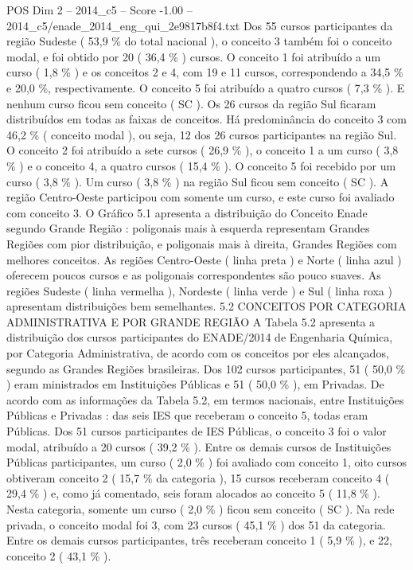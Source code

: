 \begin{textsample}{POS Dim 2 – 2014\_c5 – Score -1.00 – 2014\_c5/enade\_2014\_eng\_qui\_2e9817b8f4.txt}
Dos 55 cursos participantes da região Sudeste ( 53,9 \% do total nacional ), o conceito 3 também foi o conceito modal, e foi obtido por 20 ( 36,4 \% ) cursos.
O conceito 1 foi atribuído a um curso ( 1,8 \% ) e os conceitos 2 e 4, com 19 e 11 cursos, correspondendo a 34,5 \% e 20,0 \%, respectivamente.
O conceito 5 foi atribuído a quatro cursos ( 7,3 \% ).
E nenhum curso ficou sem conceito ( SC ).
Os 26 cursos da região Sul ficaram distribuídos em todas as faixas de conceitos.
Há predominância do conceito 3 com 46,2 \% ( conceito modal ), ou seja, 12 dos 26 cursos participantes na região Sul.
O conceito 2 foi atribuído a sete cursos ( 26,9 \% ), o conceito 1 a um curso ( 3,8 \% ) e o conceito 4, a quatro cursos ( 15,4 \% ).
O conceito 5 foi recebido por um curso ( 3,8 \% ).
Um curso ( 3,8 \% ) na região Sul ficou sem conceito ( SC ).
A região Centro-Oeste participou com somente um curso, e este curso foi avaliado com conceito 3.
O Gráfico 5.1 apresenta a distribuição do Conceito Enade segundo Grande Região : poligonais mais à esquerda representam Grandes Regiões com pior distribuição, e poligonais mais à direita, Grandes Regiões com melhores conceitos.
As regiões Centro-Oeste ( linha preta ) e Norte ( linha azul ) oferecem poucos cursos e as poligonais correspondentes são pouco suaves.
As regiões Sudeste ( linha vermelha ), Nordeste ( linha verde ) e Sul ( linha roxa ) apresentam distribuições bem semelhantes. 5.2 CONCEITOS POR CATEGORIA ADMINISTRATIVA E POR GRANDE REGIÃO A Tabela 5.2 apresenta a distribuição dos cursos participantes do ENADE/2014 de Engenharia Química, por Categoria Administrativa, de acordo com os conceitos por eles alcançados, segundo as Grandes Regiões brasileiras.
Dos 102 cursos participantes, 51 ( 50,0 \% ) eram ministrados em Instituições Públicas e 51 ( 50,0 \% ), em Privadas.
De acordo com as informações da Tabela 5.2, em termos nacionais, entre Instituições Públicas e Privadas : das seis IES que receberam o conceito 5, todas eram Públicas.
Dos 51 cursos participantes de IES Públicas, o conceito 3 foi o valor modal, atribuído a 20 cursos ( 39,2 \% ).
Entre os demais cursos de Instituições Públicas participantes, um curso ( 2,0 \% ) foi avaliado com conceito 1, oito cursos obtiveram conceito 2 ( 15,7 \% da categoria ), 15 cursos receberam conceito 4 ( 29,4 \% ) e, como já comentado, seis foram alocados ao conceito 5 ( 11,8 \% ).
Nesta categoria, somente um curso ( 2,0 \% ) ficou sem conceito ( SC ).
Na rede privada, o conceito modal foi 3, com 23 cursos ( 45,1 \% ) dos 51 da categoria.
Entre os demais cursos participantes, três receberam conceito 1 ( 5,9 \% ), e 22, conceito 2 ( 43,1 \% ).

\end{textsample}
